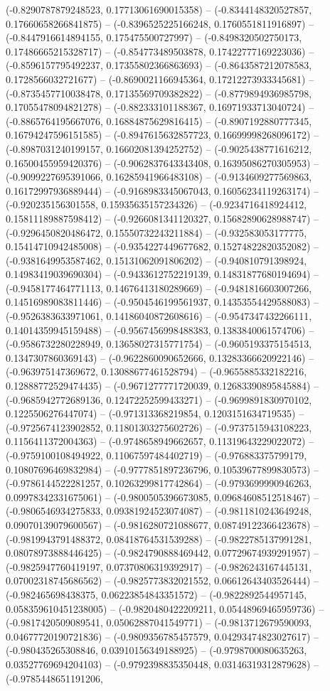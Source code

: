 (-0.8290787879248523, 0.17713061690015358) -- (-0.8344148320527857, 0.17660658266841875) -- (-0.8396525225166248, 0.1760551811916897) -- (-0.8447916614894155, 0.175475500727997) -- (-0.8498320502750173, 0.17486665215328717) -- (-0.854773489503878, 0.17422777169223036) -- (-0.8596157795492237, 0.17355802366863693) -- (-0.8643587212078583, 0.1728566032721677) -- (-0.8690021166945364, 0.17212273933345681) -- (-0.8735457710038478, 0.17135569709382822) -- (-0.8779894936985798, 0.17055478094821278) -- (-0.882333101188367, 0.16971933713040724) -- (-0.8865764195667076, 0.16884875629816415) -- (-0.8907192880777345, 0.16794247596151585) -- (-0.8947615632857723, 0.16699998268096172) -- (-0.8987031240199157, 0.16602081394252752) -- (-0.9025438771616212, 0.16500455959420376) -- (-0.9062837643343408, 0.16395086270305953) -- (-0.9099227695391066, 0.16285941966483108) -- (-0.9134609277569863, 0.16172997936889444) -- (-0.9168983345067043, 0.16056234119263174) -- (-0.920235156301558, 0.15935635157234326) -- (-0.9234716418924412, 0.15811189887598412) -- (-0.9266081341120327, 0.15682890628988747) -- (-0.9296450820486472, 0.15550732243211884) -- (-0.932583053177775, 0.15414710942485008) -- (-0.9354227449677682, 0.15274822820352082) -- (-0.9381649953587462, 0.15131062091806202) -- (-0.940810791398924, 0.14983419039690304) -- (-0.9433612752219139, 0.14831877680194694) -- (-0.9458177464771113, 0.14676413180289669) -- (-0.9481816603007266, 0.14516989083811446) -- (-0.9504546199561937, 0.14353554429588083) -- (-0.9526383633971061, 0.14186040872608616) -- (-0.9547347432266111, 0.14014359945159488) -- (-0.9567456998488383, 0.1383840061574706) -- (-0.9586732280228949, 0.13658027315771754) -- (-0.9605193375154513, 0.1347307860369143) -- (-0.9622860090652666, 0.13283366620922146) -- (-0.963975147369672, 0.13088677461528794) -- (-0.9655885332182216, 0.12888772529474435) -- (-0.9671277771720039, 0.12683390895845884) -- (-0.9685942772689136, 0.12472252599433271) -- (-0.9699891830970102, 0.1225506276447074) -- (-0.971313368219854, 0.1203151634719535) -- (-0.9725674123902852, 0.11801303275602726) -- (-0.9737515943108223, 0.1156411372004363) -- (-0.9748658949662657, 0.11319643229022072) -- (-0.9759100108494922, 0.11067597484402719) -- (-0.976883375799179, 0.10807696469832984) -- (-0.9777851897236796, 0.10539677899830573) -- (-0.9786144522281257, 0.10263299817742864) -- (-0.9793699990946263, 0.09978342331675061) -- (-0.9800505396673085, 0.09684608512518467) -- (-0.9806546934275833, 0.09381924523074087) -- (-0.9811810243649248, 0.09070139079600567) -- (-0.9816280721088677, 0.08749122366423678) -- (-0.9819943791488372, 0.08418764531539288) -- (-0.9822785137991281, 0.08078973888446425) -- (-0.9824790888469442, 0.07729674939291957) -- (-0.9825947760419197, 0.07370806319392917) -- (-0.9826243167445131, 0.07002318745686562) -- (-0.9825773832021552, 0.06612643403526444) -- (-0.982465698438375, 0.06223854843351572) -- (-0.9822892544957145, 0.058359610451238005) -- (-0.9820480422209211, 0.05448969465959736) -- (-0.9817420509089541, 0.05062887041549771) -- (-0.9813712679590093, 0.04677720190721836) -- (-0.9809356785457579, 0.04293474823027617) -- (-0.980435265308846, 0.03910156349188925) -- (-0.9798700080635263, 0.03527769694204103) -- (-0.9792398835350448, 0.03146319312879628) -- (-0.9785448651191206, 